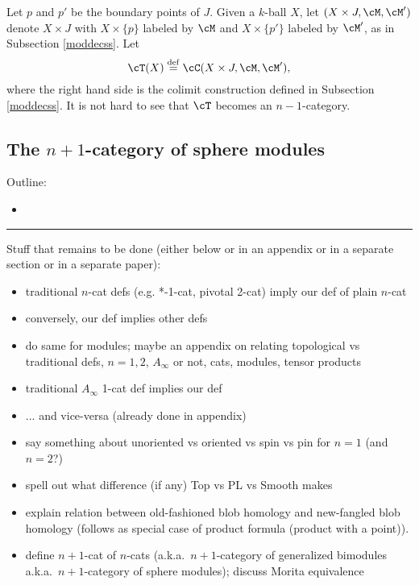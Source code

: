 Let $p$ and $p'$ be the boundary points of $J$.
Given a $k$-ball $X$, let $(X\times J, \cM, \cM')$ denote $X\times J$ with
$X\times\{p\}$ labeled by $\cM$ and $X\times\{p'\}$ labeled by $\cM'$, as in Subsection \ref{moddecss}.
Let
\[
	\cT(X) \deq \cC(X\times J, \cM, \cM') ,
\]
where the right hand side is the colimit construction defined in Subsection \ref{moddecss}.
It is not hard to see that $\cT$ becomes an $n{-}1$-category.



\subsection{The $n{+}1$-category of sphere modules}

Outline:
\begin{itemize}
\item 
\end{itemize}



\medskip
\hrule
\medskip

\medskip


Stuff that remains to be done (either below or in an appendix or in a separate section or in
a separate paper):
\begin{itemize}
\item traditional $n$-cat defs (e.g. *-1-cat, pivotal 2-cat) imply our def of plain $n$-cat
\item conversely, our def implies other defs
\item do same for modules; maybe an appendix on relating topological
vs traditional defs, $n = 1,2$, $A_\infty$ or not, cats, modules, tensor products
\item traditional $A_\infty$ 1-cat def implies our def
\item ... and vice-versa (already done in appendix)
\item say something about unoriented vs oriented vs spin vs pin for $n=1$ (and $n=2$?)
\item spell out what difference (if any) Top vs PL vs Smooth makes
\item explain relation between old-fashioned blob homology and new-fangled blob homology
(follows as special case of product formula (product with a point)).
\item define $n{+}1$-cat of $n$-cats (a.k.a.\ $n{+}1$-category of generalized bimodules
a.k.a.\ $n{+}1$-category of sphere modules); discuss Morita equivalence
\end{itemize}


